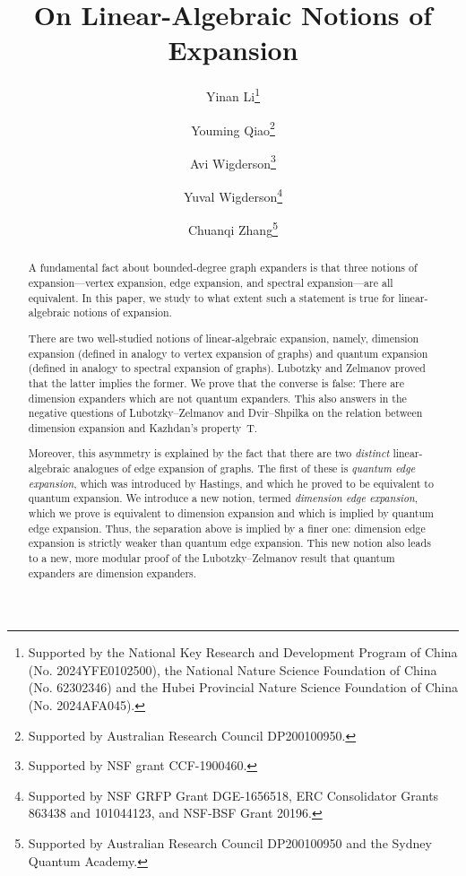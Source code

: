 \documentclass{toc}
\theoremstyle{plain}
\numberwithin{equation}{section}
\theoremstyle{definition}
\begin{document}
\begin{frontmatter}%

%
%
%

%
\title{On Linear-Algebraic Notions of Expansion}  %

%
%

%
%
%
%
%
%

%
%
%
%
%
%
%
%
%
%
%
%


%
%
%
%

%

%
\author[Li]{Yinan Li\thanks{Supported by the National Key Research and Development Program of China (No. 2024YFE0102500), the National Nature Science Foundation of China (No. 62302346) and the Hubei Provincial Nature Science Foundation of China (No. 2024AFA045).}} %
\author[Qiao]{Youming Qiao\thanks{Supported by Australian Research Council DP200100950.}}
\author[WigdersonA]{Avi Wigderson\thanks{Supported by NSF grant CCF-1900460.}}
\author[WigdersonY]{Yuval Wigderson\thanks{Supported by NSF GRFP Grant DGE-1656518, ERC Consolidator Grants 863438 and 101044123, and NSF-BSF Grant 20196.}}
\author[Zhang]{Chuanqi Zhang\thanks{Supported by Australian Research Council DP200100950 and the Sydney Quantum Academy.}}

%
%
%
%

%
%
%
%
%
%
%
%
\begin{abstract}
A fundamental fact about bounded-degree graph expanders is that three notions of expansion---vertex expansion, edge expansion, and spectral expansion---are all equivalent. In this paper, we study to what extent such a statement is true for linear-algebraic notions of expansion.

There are two well-studied notions of linear-algebraic expansion, 
namely, %
dimension expansion
(defined in analogy to
%
vertex expansion of graphs) %
and quantum expansion (defined in analogy to
%
spectral expansion of graphs).  %
Lubotzky and Zelmanov proved that the latter implies the former. We prove that the converse is false: There are dimension expanders which are not quantum expanders. This also answers in the negative questions of Lubotzky--Zelmanov and Dvir--Shpilka on the relation between dimension expansion and Kazhdan's property~T.

Moreover, this asymmetry is explained by the fact that there are two \emph{distinct} linear-algebraic analogues of %
edge expansion of graphs.  %
The first of these is \emph{quantum edge expansion}, which was introduced by Hastings, and which he proved to be equivalent to quantum expansion. We introduce a new notion, termed \emph{dimension edge expansion}, which we prove is equivalent to dimension expansion and which is implied by quantum edge expansion. Thus, the separation above is implied by a finer one: dimension edge expansion is strictly weaker than quantum edge expansion. This new notion also leads to a new, more modular proof of the Lubotzky--Zelmanov result that quantum expanders are dimension expanders.
\end{abstract}


\end{frontmatter}
\end{document}
